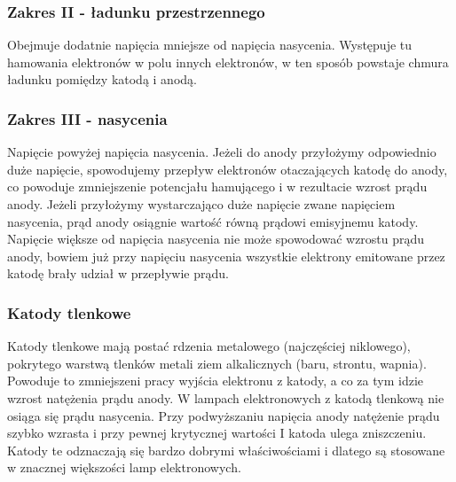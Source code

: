 \documentclass[paper=a4, fontsize=12pt]{scrartcl}
\begin{document}
\subsubsection{Zakres II - ładunku przestrzennego}
	
	Obejmuje dodatnie napięcia mniejsze od napięcia nasycenia. Występuje tu hamowania elektronów w polu innych elektronów, w ten sposób powstaje chmura ładunku pomiędzy katodą i anodą. 
\subsubsection{Zakres III - nasycenia}
	
	Napięcie powyżej napięcia nasycenia. Jeżeli do anody przyłożymy odpowiednio duże napięcie, spowodujemy przepływ elektronów otaczających katodę do anody, co powoduje zmniejszenie potencjału hamującego i w rezultacie wzrost prądu anody. Jeżeli przyłożymy wystarczająco duże napięcie zwane napięciem nasycenia, prąd anody osiągnie wartość równą prądowi emisyjnemu katody. Napięcie większe od napięcia nasycenia nie może spowodować wzrostu prądu anody, bowiem już przy napięciu nasycenia wszystkie elektrony emitowane przez katodę brały udział w przepływie prądu.
\subsubsection{Katody tlenkowe}
Katody tlenkowe mają postać rdzenia metalowego (najczęściej niklowego), pokrytego warstwą tlenków metali ziem alkalicznych (baru, strontu, wapnia). Powoduje to zmniejszeni pracy wyjścia elektronu z katody, a co za tym idzie wzrost natężenia prądu anody. W lampach elektronowych z katodą tlenkową nie osiąga się prądu nasycenia. Przy podwyższaniu napięcia anody natężenie prądu szybko wzrasta i przy pewnej krytycznej wartości I katoda ulega zniszczeniu. Katody te odznaczają się bardzo dobrymi właściwościami i dlatego są stosowane w znacznej większości lamp elektronowych.
\end{document}
